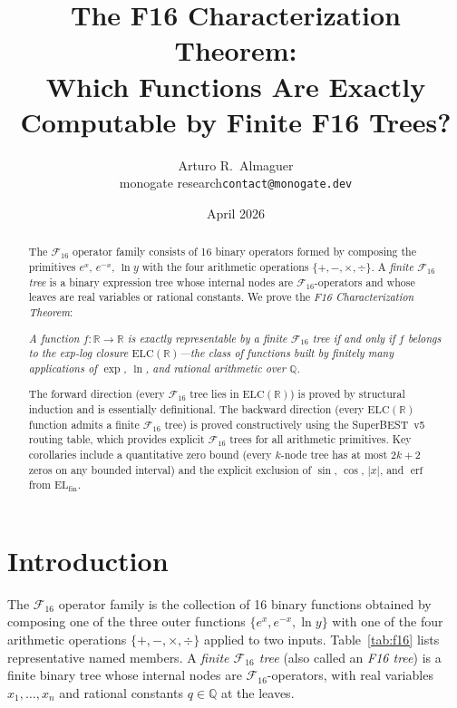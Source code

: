 \documentclass[12pt,a4paper]{article}
\title{The F16 Characterization Theorem:\\[4pt]
       Which Functions Are Exactly Computable by Finite F16 Trees?}
\author{Arturo R.\ Almaguer\\
  \small monogate research\quad\texttt{contact@monogate.dev}}
\date{April 2026}
\theoremstyle{definition}
\newcommand{\F}{\mathcal{F}_{16}}
\newcommand{\ELfin}{\mathrm{EL}_{\mathrm{fin}}}
\newcommand{\ELC}{\mathrm{ELC}(\mathbb{R})}
\newcommand{\R}{\mathbb{R}}
\newcommand{\Q}{\mathbb{Q}}
\begin{document}
\maketitle

\begin{abstract}
The $\F$ operator family consists of 16 binary operators formed by composing
the primitives $e^x$, $e^{-x}$, $\ln y$ with the four arithmetic operations
$\{+,-,\times,\div\}$.  A \emph{finite $\F$ tree} is a binary expression tree
whose internal nodes are $\F$-operators and whose leaves are real variables
or rational constants.  We prove the \emph{F16 Characterization Theorem}:

\begin{center}
  \textit{A function $f:\R\to\R$ is exactly representable by a finite $\F$ tree
  if and only if $f$ belongs to the exp-log closure $\ELC$---the class of
  functions built by finitely many applications of $\exp$, $\ln$, and rational
  arithmetic over $\Q$.}
\end{center}

The forward direction (every $\F$ tree lies in $\ELC$) is proved by structural
induction and is essentially definitional.  The backward direction (every $\ELC$
function admits a finite $\F$ tree) is proved constructively using the
SuperBEST~v5 routing table, which provides explicit $\F$ trees for all
arithmetic primitives.  Key corollaries include a quantitative zero bound
(every $k$-node tree has at most $2k+2$ zeros on any bounded interval) and the
explicit exclusion of $\sin$, $\cos$, $|x|$, and $\operatorname{erf}$ from
$\ELfin$.
\end{abstract}

\tableofcontents
\bigskip

\section{Introduction}
\label{sec:intro}

The $\F$ operator family is the collection of 16 binary functions obtained by
composing one of the three outer functions $\{e^x, e^{-x}, \ln y\}$ with one
of the four arithmetic operations $\{+,-,\times,\div\}$ applied to two
inputs.  Table~\ref{tab:f16} lists representative named members.  A
\emph{finite $\F$ tree} (also called an \emph{F16 tree}) is a finite binary
tree whose internal nodes are $\F$-operators, with real variables $x_1,\ldots,
x_n$ and rational constants $q\in\Q$ at the leaves.
\end{document}
